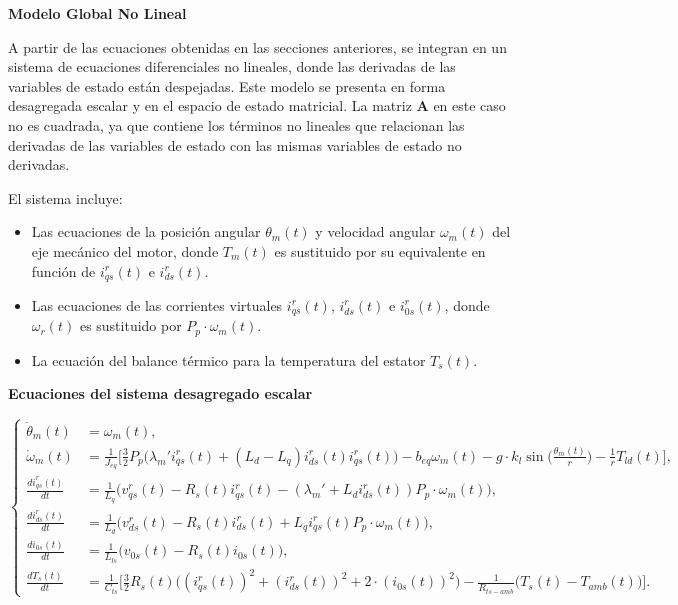 \documentclass{article}
\begin{document}
\textbf{Modelo Global No Lineal}

A partir de las ecuaciones obtenidas en las secciones anteriores, se integran en un sistema de ecuaciones diferenciales no lineales, donde las derivadas de las variables de estado están despejadas. Este modelo se presenta en forma desagregada escalar y en el espacio de estado matricial. La matriz \(\mathbf{A}\) en este caso no es cuadrada, ya que contiene los términos no lineales que relacionan las derivadas de las variables de estado con las mismas variables de estado no derivadas.

El sistema incluye:

\begin{itemize}
    \item Las ecuaciones de la posición angular \(\theta_m(t)\) y velocidad angular \(\omega_m(t)\) del eje mecánico del motor, donde \(T_m(t)\) es sustituido por su equivalente en función de \(i_{qs}^r(t)\) e \(i_{ds}^r(t)\).
    \item Las ecuaciones de las corrientes virtuales \(i_{qs}^r(t)\), \(i_{ds}^r(t)\) e \(i_{0s}^r(t)\), donde \(\omega_r(t)\) es sustituido por \(P_p \cdot \omega_m(t)\).
    \item La ecuación del balance térmico para la temperatura del estator \(T_s(t)\).
\end{itemize}

\textbf{Ecuaciones del sistema desagregado escalar}

\begin{equation}
\left\{
\begin{aligned}
    \dot{\theta}_m(t) &= \omega_m(t), \\
    \dot{\omega}_m(t) &= \frac{1}{J_{eq}} \Bigg[ \frac{3}{2} P_p \Big( \lambda_m' i_{qs}^r(t) + (L_d - L_q) i_{ds}^r(t) i_{qs}^r(t) \Big) - b_{eq} \omega_m(t) - g \cdot k_l \sin\Bigg(\frac{\theta_m(t)}{r}\Bigg) - \frac{1}{r} T_{ld}(t) \Bigg], \\
    \frac{d i_{qs}^r(t)}{dt} &= \frac{1}{L_q} \Big( v_{qs}^r(t) - R_s(t) i_{qs}^r(t) - (\lambda_m' + L_d i_{ds}^r(t)) P_p \cdot \omega_m(t) \Big), \\
    \frac{d i_{ds}^r(t)}{dt} &= \frac{1}{L_d} \Big( v_{ds}^r(t) - R_s(t) i_{ds}^r(t) + L_q i_{qs}^r(t) P_p \cdot \omega_m(t) \Big), \\
    \frac{d i_{0s}(t)}{dt} &= \frac{1}{L_{ls}} \Big( v_{0s}(t) - R_s(t) i_{0s}(t) \Big), \\
    \frac{d T_s(t)}{dt} &= \frac{1}{C_{ts}} \Bigg[ \frac{3}{2} R_s(t) \Big( (i_{qs}^r(t))^2 + (i_{ds}^r(t))^2 + 2 \cdot (i_{0s}(t))^2 \Big) - \frac{1}{R_{ts-amb}} \big( T_s(t) - T_{amb}(t) \big) \Bigg].
\end{aligned}
\right.
\end{equation}
\end{document}
